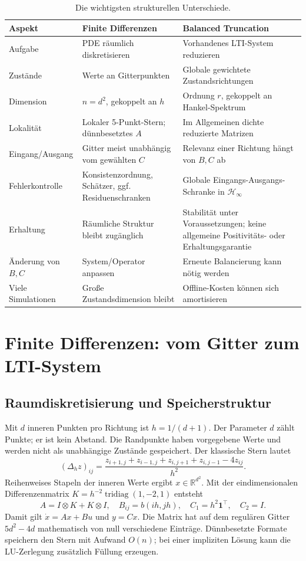 \documentclass[11pt,a4paper]{article}
\newcommand{\R}{\mathbb{R}}
\newcommand{\Hinfty}{\mathcal{H}_\infty}
\begin{document}
\begin{table}[htbp]\centering\small
\caption{Die wichtigsten strukturellen Unterschiede.}
\begin{tabularx}{\linewidth}{>{\raggedright\arraybackslash}p{30mm}>{\raggedright\arraybackslash}X>{\raggedright\arraybackslash}X}\toprule
Aspekt & Finite Differenzen & Balanced Truncation\\\midrule
Aufgabe & PDE räumlich diskretisieren & Vorhandenes LTI-System reduzieren\\
Zustände & Werte an Gitterpunkten & Globale gewichtete Zustandsrichtungen\\
Dimension & $n=d^2$, gekoppelt an $h$ & Ordnung $r$, gekoppelt an Hankel-Spektrum\\
Lokalität & Lokaler 5-Punkt-Stern; dünnbesetztes $A$ & Im Allgemeinen dichte reduzierte Matrizen\\
Eingang/Ausgang & Gitter meist unabhängig vom gewählten $C$ & Relevanz einer Richtung hängt von $B,C$ ab\\
Fehlerkontrolle & Konsistenzordnung, Schätzer, ggf. Residuenschranken & Globale Eingangs-Ausgangs-Schranke in $\Hinfty$\\
Erhaltung & Räumliche Struktur bleibt zugänglich & Stabilität unter Voraussetzungen; keine allgemeine Positivitäts- oder Erhaltungsgarantie\\
Änderung von $B,C$ & System/Operator anpassen & Erneute Balancierung kann nötig werden\\
Viele Simulationen & Große Zustandsdimension bleibt & Offline-Kosten können sich amortisieren\\\bottomrule
\end{tabularx}
\end{table}

\section{Finite Differenzen: vom Gitter zum LTI-System}
\subsection{Raumdiskretisierung und Speicherstruktur}
Mit $d$ inneren Punkten pro Richtung ist $h=1/(d+1)$. Der Parameter $d$ zählt Punkte; er ist kein Abstand. Die Randpunkte haben vorgegebene Werte und werden nicht als unabhängige Zustände gespeichert. Der klassische Stern lautet
\begin{equation}
 (\Delta_h z)_{ij}=\frac{z_{i+1,j}+z_{i-1,j}+z_{i,j+1}+z_{i,j-1}-4z_{ij}}{h^2}.
\end{equation}
Reihenweises Stapeln der inneren Werte ergibt $x\in\R^{d^2}$. Mit der eindimensionalen Differenzenmatrix $K=h^{-2}\operatorname{tridiag}(1,-2,1)$ entsteht
\begin{equation}
 A=I\otimes K+K\otimes I,\quad B_{ij}=b(ih,jh),\quad
 C_1=h^2\mathbf 1^\top,\quad C_2=I.
\end{equation}
Damit gilt $\dot x=Ax+Bu$ und $y=Cx$. Die Matrix hat auf dem regulären Gitter $5d^2-4d$ mathematisch von null verschiedene Einträge. Dünnbesetzte Formate speichern den Stern mit Aufwand $O(n)$; bei einer impliziten Lösung kann die LU-Zerlegung zusätzlich Füllung erzeugen.
\end{document}
